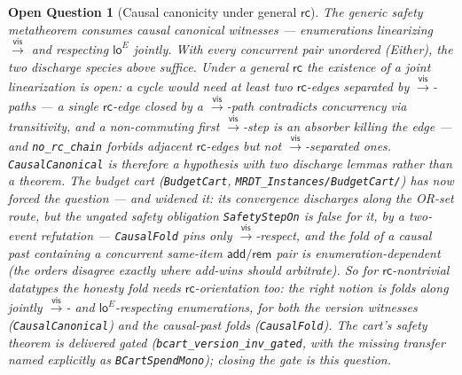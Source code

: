\documentclass[11pt]{article}
\newtheorem{openq}[theorem]{Open Question}
\newcommand{\vis}{\xrightarrow{\mathsf{vis}}}
\newcommand{\loE}[1]{\mathsf{lo}^{#1}}
\newcommand{\lean}[1]{\texttt{#1}}
\begin{document}
\begin{openq}[Causal canonicity under general $\mathsf{rc}$]
\label{oq:causalcanon}
The generic safety metatheorem consumes \emph{causal} canonical
witnesses --- enumerations linearizing $\vis$ and respecting $\loE{E}$
jointly. With every concurrent pair unordered (Either), the two discharge
species above suffice. Under a general $\mathsf{rc}$ the existence of a
joint linearization is open: a cycle would need at least two
$\mathsf{rc}$-edges separated by $\vis$-paths --- a single
$\mathsf{rc}$-edge closed by a $\vis$-path contradicts concurrency via
transitivity, and a non-commuting first $\vis$-step is an absorber
killing the edge --- and \lean{no\_rc\_chain} forbids adjacent
$\mathsf{rc}$-edges but not $\vis$-separated ones. \lean{CausalCanonical} is therefore a hypothesis with two discharge
lemmas rather than a theorem. The budget cart (\lean{BudgetCart},
\lean{MRDT\_Instances/BudgetCart/}) has now \emph{forced} the question ---
and widened it: its convergence discharges along the OR-set route, but the
ungated safety obligation \lean{SafetyStepOn} is \emph{false} for it, by a
two-event refutation --- \lean{CausalFold} pins only $\vis$-respect, and
the fold of a causal past containing a concurrent same-item
$\mathsf{add}/\mathsf{rem}$ pair is enumeration-dependent (the orders
disagree exactly where add-wins should arbitrate). So for
$\mathsf{rc}$-nontrivial datatypes the \emph{honesty fold} needs
$\mathsf{rc}$-orientation too: the right notion is folds along jointly
$\vis$- and $\loE{E}$-respecting enumerations, for both the version
witnesses (\lean{CausalCanonical}) and the causal-past folds
(\lean{CausalFold}). The cart's safety theorem is delivered gated
(\lean{bcart\_version\_inv\_gated}, with the missing transfer named
explicitly as \lean{BCartSpendMono}); closing the gate is this question.
\end{openq}
\end{document}
